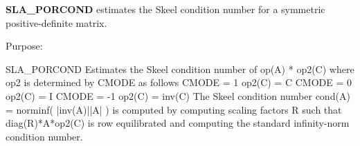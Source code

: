 {\bfseries S\+L\+A\+\_\+\+P\+O\+R\+C\+O\+N\+D} estimates the Skeel condition number for a symmetric positive-\/definite matrix. 

 \begin{DoxyParagraph}{Purpose\+: }
\begin{DoxyVerb}    SLA_PORCOND Estimates the Skeel condition number of  op(A) * op2(C)
    where op2 is determined by CMODE as follows
    CMODE =  1    op2(C) = C
    CMODE =  0    op2(C) = I
    CMODE = -1    op2(C) = inv(C)
    The Skeel condition number  cond(A) = norminf( |inv(A)||A| )
    is computed by computing scaling factors R such that
    diag(R)*A*op2(C) is row equilibrated and computing the standard
    infinity-norm condition number.\end{DoxyVerb}
 
\end{DoxyParagraph}

